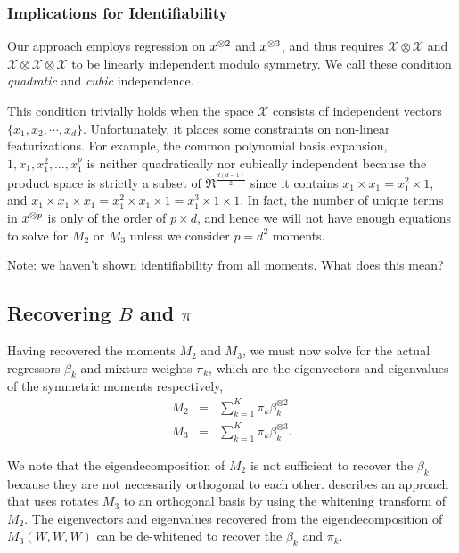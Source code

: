 \subsubsection{Implications for Identifiability}

Our approach employs regression on $x^{\otimes 2}$ and $x^{\otimes 3}$, and thus
requires $\mathcal{X} \otimes \mathcal{X}$ and $\mathcal{X} \otimes
\mathcal{X} \otimes \mathcal{X}$ to be linearly independent modulo
symmetry. We call these condition {\em quadratic} and {\em cubic}
independence.

This condition trivially holds when the space $\mathcal{X}$ consists of
independent vectors $\{ x_1, x_2, \cdots, x_d \}$. Unfortunately, it
places some constraints on non-linear featurizations. For example, the
common polynomial basis expansion, $1, x_1, x_1^2, \dots, x_1^p$ is
neither quadratically nor cubically independent because the product
space is strictly a subset of $\Re^{\frac{d (d-1)}{2}}$ since it
contains $x_1 \times x_1 = x_1^2 \times 1$, and $x_1 \times x_1 \times
x_1 = x_1^2 \times x_1 \times 1 = x_1^3 \times 1 \times 1$. In fact, the
number of unique terms in $x^{\otimes p}$ is only of the order of $p \times
d$, and hence we will not have enough equations to solve for $M_2$ or
$M_3$ unless we consider $p = d^2$ moments.

{\todo Note: we haven't shown identifiability from all moments. What
does this mean?}

\subsection{Recovering $B$ and $\pi$}

Having recovered the moments $M_2$ and $M_3$, we must now solve for the
actual regressors $\beta_k$ and mixture weights $\pi_k$, which are the
eigenvectors and eigenvalues of the symmetric moments respectively,
\begin{eqnarray*}
  M_2 &=&  \sum_{k=1}^{K} \pi_k \beta_k^{\otimes 2}\\
  M_3 &=& \sum_{k=1}^{K} \pi_k \beta_k^{\otimes 3}.
\end{eqnarray*}

We note that the eigendecomposition of $M_2$ is not sufficient to
recover the $\beta_k$ because they are not necessarily orthogonal to
each other. \citet{AnandkumarGeHsu2012} describes an approach that uses
rotates $M_3$ to an orthogonal basis by using the whitening transform of
$M_2$. The eigenvectors and eigenvalues recovered from the
eigendecomposition of $M_3(W, W, W)$ can be de-whitened to recover the
$\beta_k$ and $\pi_k$.

